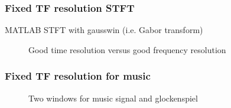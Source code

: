 \documentclass{beamer}
\begin{document}
\begin{frame}
	\frametitle{Fixed TF resolution STFT}
	MATLAB STFT with gausswin (i.e. Gabor transform)
	\begin{figure}
		\centering
		\caption{Good time resolution versus good frequency resolution}
	\end{figure}
\end{frame}

\begin{frame}
	\frametitle{Fixed TF resolution for music}
	\begin{figure}
		\centering
		\caption{Two windows for music signal and glockenspiel}
	\end{figure}
\end{frame}
\end{document}
